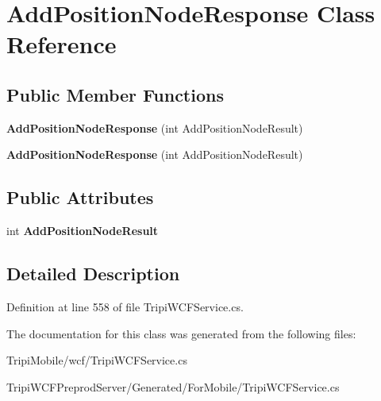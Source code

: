 \hypertarget{class_add_position_node_response}{
\section{AddPositionNodeResponse Class Reference}
\label{class_add_position_node_response}
}
\subsection*{Public Member Functions}
\begin{DoxyCompactItemize}
\item 
\hypertarget{class_add_position_node_response_aa352a7517b183dd071492846781925a0}{
{\bfseries AddPositionNodeResponse} (int AddPositionNodeResult)}
\label{class_add_position_node_response_aa352a7517b183dd071492846781925a0}

\item 
\hypertarget{class_add_position_node_response_aa352a7517b183dd071492846781925a0}{
{\bfseries AddPositionNodeResponse} (int AddPositionNodeResult)}
\label{class_add_position_node_response_aa352a7517b183dd071492846781925a0}

\end{DoxyCompactItemize}
\subsection*{Public Attributes}
\begin{DoxyCompactItemize}
\item 
\hypertarget{class_add_position_node_response_a1e1c56df6d822d30ad42bf4404047d5d}{
int {\bfseries AddPositionNodeResult}}
\label{class_add_position_node_response_a1e1c56df6d822d30ad42bf4404047d5d}

\end{DoxyCompactItemize}


\subsection{Detailed Description}


Definition at line 558 of file TripiWCFService.cs.

The documentation for this class was generated from the following files:\begin{DoxyCompactItemize}
\item 
TripiMobile/wcf/TripiWCFService.cs\item 
TripiWCFPreprodServer/Generated/ForMobile/TripiWCFService.cs\end{DoxyCompactItemize}
